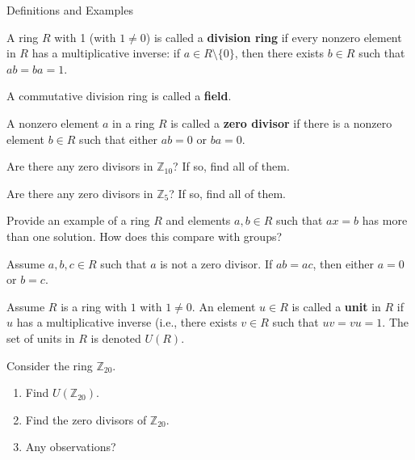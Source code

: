 \begin{section}{Definitions and Examples}
\begin{definition}
A ring $R$ with 1 (with $1\neq 0$) is called a \textbf{division ring} if every nonzero element in $R$ has a multiplicative inverse: if $a\in R\setminus\{0\}$, then there exists $b\in R$ such that $ab=ba=1$.
\end{definition}

\begin{definition}
A commutative division ring is called a \textbf{field}.
\end{definition}

\begin{definition}
A nonzero element $a$ in a ring $R$ is called a \textbf{zero divisor} if there is a nonzero element $b\in R$ such that either $ab=0$ or $ba=0$.
\end{definition}

\begin{problem}
Are there any zero divisors in $\mathbb{Z}_{10}$?  If so, find all of them.
\end{problem}

\begin{problem}
Are there any zero divisors in $\mathbb{Z}_5$?  If so, find all of them.
\end{problem}

\begin{problem}
Provide an example of a ring $R$ and elements $a,b\in R$ such that $ax=b$ has more than one solution.  How does this compare with groups?
\end{problem}

\begin{theorem}\label{thm:RingCancellation}
Assume $a,b,c\in R$ such that $a$ is not a zero divisor.  If $ab=ac$, then either $a=0$ or $b=c$.
\end{theorem}

\begin{definition}
Assume $R$ is a ring with $1$ with $1\neq 0$. An element $u\in R$ is called a \textbf{unit} in $R$ if $u$ has a multiplicative inverse (i.e., there exists $v\in R$ such that $uv=vu=1$.  The set of units in $R$ is denoted $U(R)$.
\end{definition}

\begin{problem}
Consider the ring $\mathbb{Z}_{20}$.
\begin{enumerate}[label=\rm{(\alph*)}]
\item Find $U(\mathbb{Z}_{20})$.
\item Find the zero divisors of $\mathbb{Z}_{20}$.
\item Any observations?
\end{enumerate}
\end{problem}


\end{section}

